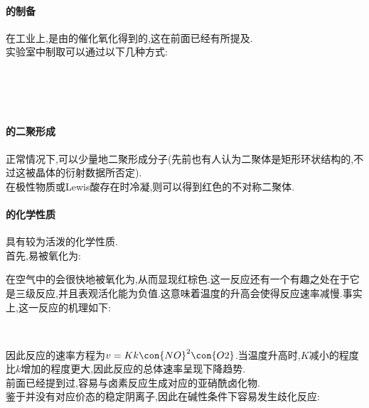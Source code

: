 \documentclass{ctexbook}
\begin{document}
\paragraph{的制备}
在工业上,是由的催化氧化得到的,这在前面已经有所提及.\\
\indent 实验室中制取可以通过以下几种方式:
\begin{center}
    \\
    \\
    \\
\end{center}
\paragraph{的二聚形成}
正常情况下,可以少量地二聚形成分子(先前也有人认为二聚体是矩形环状结构的,不过这被晶体的衍射数据所否定).\\
\indent 在极性物质或Lewis酸存在时冷凝,则可以得到红色的不对称二聚体.
\paragraph{的化学性质}
具有较为活泼的化学性质.\\
\indent 首先,易被氧化为:
\begin{center}
\end{center}
在空气中的会很快地被氧化为,从而显现红棕色.这一反应还有一个有趣之处在于它是三级反应,并且表观活化能为负值.这意味着温度的升高会使得反应速率减慢.事实上,这一反应的机理如下:
\begin{center}
    \\
\end{center}
因此反应的速率方程为$v=Kk\con{NO}^2\con{O2}$.当温度升高时,$K$减小的程度比$k$增加的程度更大,因此反应的总体速率呈现下降趋势.\\
\indent 前面已经提到过,容易与卤素反应生成对应的亚硝酰卤化物.\\
\indent 鉴于并没有对应价态的稳定阴离子,因此在碱性条件下容易发生歧化反应:
\begin{center}
    \\
    \\
\end{center}
\end{document}
